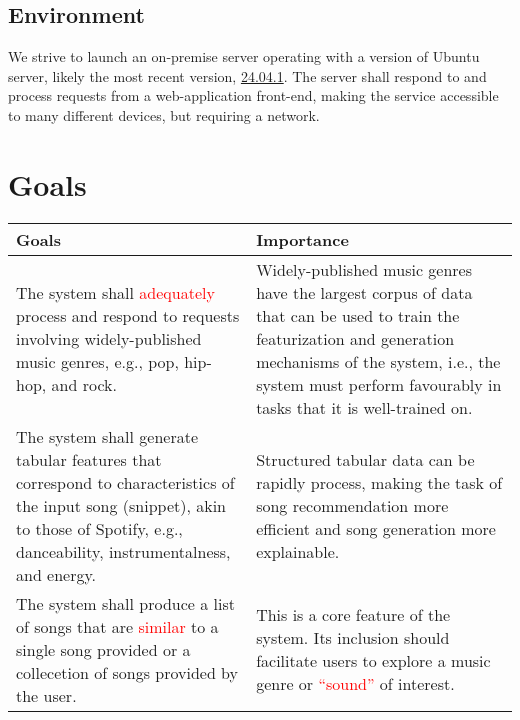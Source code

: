 \documentclass{article}
\begin{document}
\subsection{Environment}
We strive to launch an on-premise server operating with a version of Ubuntu server, likely the most recent version, \href{https://ubuntu.com/download/server}{24.04.1}. The server shall respond to and process requests from a web-application front-end, making the service accessible to many different devices, but requiring a network.

\section{Goals}
\begin{table}[h]
    \centering
    \begin{tabular}{|| p{} | p{} ||}
        \hline
        \textbf{Goals} & \textbf{Importance} \\
        \hline
        The system shall \textcolor{red}{adequately} process and respond to 
        requests involving widely-published music genres, e.g., pop, hip-hop, 
        and rock. & Widely-published music genres have the largest corpus of 
        data that can be used to train the featurization and generation 
        mechanisms of the system, i.e., the system must perform favourably in 
        tasks that it is well-trained on. \\
        \hline
        The system shall generate tabular features that correspond to characteristics 
        of the input song (snippet), akin to those of Spotify, e.g., danceability, 
        instrumentalness, and energy. & Structured tabular data can be rapidly process, 
        making the task of song recommendation more efficient and song generation 
        more explainable. \\
        \hline
        The system shall produce a list of songs that are \textcolor{red}{similar} 
        to a single song provided or a collecetion of songs provided by the user. & 
        This is a core feature of the system. Its inclusion should facilitate users 
        to explore a music genre or \textcolor{red}{``sound''} of interest. \\
        \hline
    \end{tabular}
\end{table}

\end{document}
